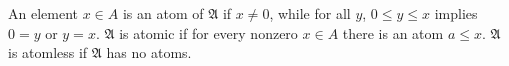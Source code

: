 An element $x \in A$ is an atom of $\mathfrak{A}$ if $x \neq 0$, while for all $y$, $0 \leq y \leq x$ implies $0 = y$ or $y = x$. $\mathfrak{A}$ is atomic if for every nonzero $x \in A$ there is an atom $a \leq x$. $\mathfrak{A}$ is atomless if $\mathfrak{A}$ has no atoms.
